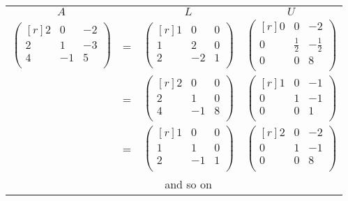 \documentclass[12pt,class=book,crop=false]{standalone}
\begin{document}
\begin{table}[H]
    \centering
    \begin{tabular}{cccc}
        $ A $                          &   & $ L $                          & $ U $                          \\
        $ \begin{pmatrix*}[r]
                2 & 0 & -2\\
                2 & 1 & -3\\
                4 & -1 & 5\\
            \end{pmatrix*} $ & = & $ \begin{pmatrix*}[r]
                1 & 0 & 0\\
                1 & 2 & 0\\
                2 & -2 & 1\\
            \end{pmatrix*} $ & $ \begin{pmatrix*}[r]
                0 & 0 & -2\\
                0 & \frac{1}{2} & -\frac{1}{2}\\
                0 & 0 & 8\\
            \end{pmatrix*} $ \\
                                       & = & $ \begin{pmatrix*}[r]
                2 & 0 & 0\\
                2 & 1 & 0\\
                4 & -1 & 8\\
            \end{pmatrix*} $ & $ \begin{pmatrix*}[r]
                1 & 0 & -1\\
                0 & 1 & -1\\
                0 & 0 & 1\\
            \end{pmatrix*} $ \\
                                       & = & $ \begin{pmatrix*}[r]
                1 & 0 & 0\\
                1 & 1 & 0\\
                2 & -1 & 1\\
            \end{pmatrix*} $ & $ \begin{pmatrix*}[r]
                2 & 0 & -2\\
                0 & 1 & -1\\
                0 & 0 & 8\\
            \end{pmatrix*} $ \\
                                       &   & and so on                      &
    \end{tabular}
\end{table}
\end{document}
